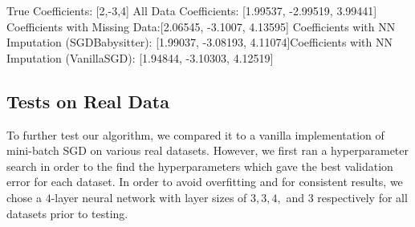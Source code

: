 \documentclass{article}
\begin{document}
True Coefficients: [2,-3,4] \newline
All Data Coefficients: [1.99537, -2.99519, 3.99441] \newline
Coefficients with Missing Data:[2.06545, -3.1007, 4.13595] \newline
Coefficients with NN Imputation (SGDBabysitter): [1.99037, -3.08193, 4.11074]\newline Coefficients with NN Imputation (VanillaSGD): [1.94844, -3.10303, 4.12519]

\subsection{Tests on Real Data}
To further test our algorithm, we compared it to a vanilla implementation of mini-batch SGD on various real datasets. However, we first ran a hyperparameter search in order to the find the hyperparameters which gave the best validation error for each dataset. In order to avoid overfitting and for consistent results, we chose a $ 4 $-layer neural network with layer sizes of $ 3, 3, 4, $ and $ 3 $ respectively for all datasets prior to testing.
\\
\end{document}
